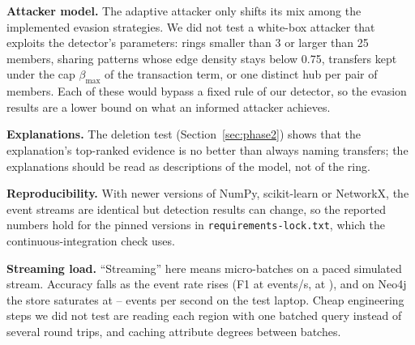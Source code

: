 \textbf{Attacker model.} The adaptive attacker only shifts its mix among the
implemented evasion strategies. We did not test a white-box attacker that
exploits the detector's parameters: rings smaller than 3 or larger than 25
members, sharing patterns whose edge density stays below 0.75, transfers kept
under the cap $\beta_{\max}$ of the transaction term, or one distinct hub per
pair of members. Each of these would bypass a fixed rule of our detector, so
the evasion results are a lower bound on what an informed attacker achieves.

\textbf{Explanations.} The deletion test (Section~\ref{sec:phase2}) shows
that the explanation's top-ranked evidence is no better than always naming
transfers; the explanations should be read as descriptions of the model, not of
the ring.

\textbf{Reproducibility.} With newer versions of NumPy, scikit-learn or
NetworkX, the event streams are identical but detection results can change, so
the reported numbers hold for the pinned versions in
\texttt{requirements-lock.txt}, which the continuous-integration check uses.

\textbf{Streaming load.} ``Streaming'' here means micro-batches on a paced
simulated stream. Accuracy falls as the event rate rises (F1 \SwRateLoF{} at
\SwRateLo{} events/s, \SwRateHiF{} at \SwRateHi{}), and on Neo4j the store
saturates at \EightTputLo{}--\EightTputHi{} events per second on the test
laptop. Cheap engineering steps we did not test are reading each region with
one batched query instead of several round trips, and caching attribute degrees
between batches.

